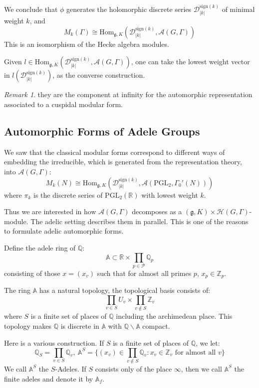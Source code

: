 \documentclass[11pt,english]{smfart}
\theoremstyle{definition}
\theoremstyle{remark}
\newtheorem*{remark}{Remark}
\begin{document}
We conclude that $\phi$ generates the holomorphic discrete series $\mathcal{D}_{|k|}^{\mathrm{sign}(k)}$ of minimal weight $k$, and
\[ M_k(\Gamma) \cong \mathrm{Hom}_{\mathfrak{g}, K}(\mathcal{D}_{|k|}^{\mathrm{sign}(k)},\mathcal{A}(G,\Gamma) )\]
This is an isomorphism of the Hecke algebra modules.

    Given $l \in\mathrm{Hom}_{\mathfrak{g}, K}(\mathcal{D}_{|k|}^{\mathrm{sign}(k)},\mathcal{A}(G,\Gamma) )$, one can take the lowest weight vector in $l(\mathcal{D}_{|k|}^{\mathrm{sign}(k)})$, as the converse construction.
\begin{remark}
they are the component at infinity for the automorphic representation associated to a cuspidal modular form.    
\end{remark}
    \subsection{Automorphic Forms of Adele Groups}
We saw that the classical modular forms correspond to different ways of embedding the irreducible, which is generated from the representation theory, into $\mathcal{A}(G,\Gamma)$:
\[M_k(N) \cong \mathrm{Hom}_{\mathfrak{g}, K}(\mathcal{D}_{|k|}^{\mathrm{sign}(k)},\mathcal{A}(\mathrm{PGL_2},\Gamma_0'(N)) )\]
where $\pi_k$ is the discrete series of $\mathrm{PGL_2}(\mathbb{R})$ with lowest weight $k$.

Thus we are interested in how $\mathcal{A}(G,\Gamma)$ decomposes as a $(\mathfrak{g}, K) \times \mathcal{H}(G,\Gamma)$-module. The adelic setting describes them in parallel. This is one of the reasons to formulate adelic automorphic forms.

Define the adele ring of $\mathbb{Q}$:
\[\mathbb{A} \subset \mathbb{R}\times \prod_{p\in \mathcal{P}}\mathbb{Q}_p \]
consisting of those $x=(x_v)$ such that for almost all primes $p$, $x_p \in \mathbb{Z}_p$.

The ring $\mathbb{A}$ has a natural topology, the topological basis consists of:
\[\prod_{v \in S} U_v \times \prod _{v\notin S} \mathbb{Z}_v\]
where $S$ is a finite set of places of $\mathbb{Q}$ including the archimedean place.
This topology makes $\mathbb{Q}$ is discrete in $\mathbb{A}$ with $\mathbb{Q} \backslash \mathbb{A}$ compact.

Here is a various construction. If $S$ is a finite set of places of $\mathbb{Q}$, we let:
\[\mathbb{Q}_S=\prod_{v \in S} \mathbb{Q}_v,\ \mathbb{A}^{S}=\{ (x_v) \in \prod_{v \notin S} \mathbb{Q}_v : x_v \in \mathbb{Z}_v\text{ for almost all }v\}\]
We call $\mathbb{A}^{S}$ the $S$-Adeles. If $S$ consists only of the place $\infty$, then we call $\mathbb{A}^{S}$ the finite adeles and denote it by $\mathbb{A}_{f}$.
\end{document}
